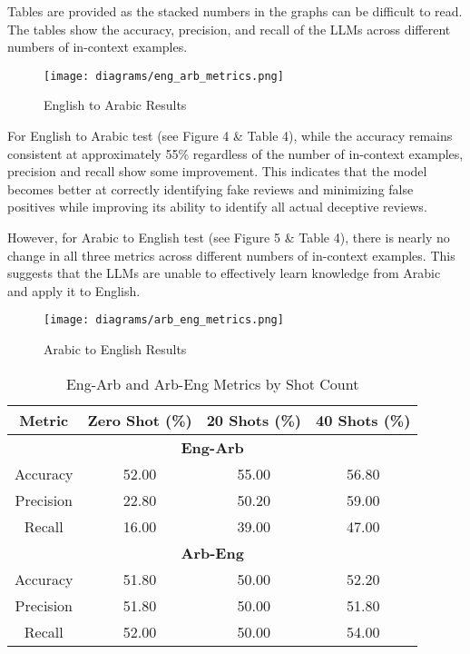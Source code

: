 \documentclass[sigconf, nonacm]{acmart}
\theoremstyle{definition}
\begin{document}
Tables are provided as the stacked numbers in the graphs can be difficult to read. The tables show the accuracy, precision, and recall of the LLMs across different numbers of in-context examples.

\begin{figure}[h]
  \centering
  \texttt{[image: diagrams/eng\_arb\_metrics.png]}
  \caption{English to Arabic Results}
\end{figure}

For English to Arabic test (see Figure 4 \& Table 4), while the accuracy remains consistent at approximately 55\% regardless of the number of in-context examples, precision and recall show some improvement. This indicates that the model becomes better at correctly identifying fake reviews and minimizing false positives while improving its ability to identify all actual deceptive reviews.

However, for Arabic to English test (see Figure 5 \& Table 4), there is nearly no change in all three metrics across different numbers of in-context examples. This suggests that the LLMs are unable to effectively learn knowledge from Arabic and apply it to English.

\begin{figure}[h]
  \centering
  \texttt{[image: diagrams/arb\_eng\_metrics.png]}
  \caption{Arabic to English Results}
\end{figure}

\begin{table}[h!]
  \centering
  \caption{Eng-Arb and Arb-Eng Metrics by Shot Count}
  \begin{tabular}{c c c c}
    \toprule
    \textbf{Metric} & \textbf{Zero Shot (\%)} & \textbf{20 Shots (\%)} & \textbf{40 Shots (\%)} \\
    \midrule
    \multicolumn{4}{c}{\textbf{Eng-Arb}}                                                        \\
    \midrule
    Accuracy        & 52.00                   & 55.00                  & 56.80                  \\
    Precision       & 22.80                   & 50.20                  & 59.00                  \\
    Recall          & 16.00                   & 39.00                  & 47.00                  \\
    \midrule
    \multicolumn{4}{c}{\textbf{Arb-Eng}}                                                        \\
    \midrule
    Accuracy        & 51.80                   & 50.00                  & 52.20                  \\
    Precision       & 51.80                   & 50.00                  & 51.80                  \\
    Recall          & 52.00                   & 50.00                  & 54.00                  \\
    \bottomrule
  \end{tabular}
\end{table}
\end{document}
